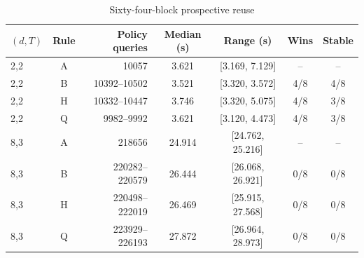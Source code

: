 \begin{table}[htbp]
\centering\caption{Sixty-four-block prospective reuse}\label{tab:reuse70}
{\small\setlength{\tabcolsep}{3pt}
\begin{tabular}{lcrcccc}
\hline
$(d,T)$ & Rule & Policy queries & Median (s) & Range (s) & Wins & Stable \\
\hline
2,2 & A & 10057 & 3.621 & [3.169, 7.129] & -- & -- \\
2,2 & B & 10392--10502 & 3.521 & [3.320, 3.572] & 4/8 & 4/8 \\
2,2 & H & 10332--10447 & 3.746 & [3.320, 5.075] & 4/8 & 3/8 \\
2,2 & Q & 9982--9992 & 3.621 & [3.120, 4.473] & 4/8 & 3/8 \\
8,3 & A & 218656 & 24.914 & [24.762, 25.216] & -- & -- \\
8,3 & B & 220282--220579 & 26.444 & [26.068, 26.921] & 0/8 & 0/8 \\
8,3 & H & 220498--222019 & 26.469 & [25.915, 27.568] & 0/8 & 0/8 \\
8,3 & Q & 223929--226193 & 27.872 & [26.964, 28.973] & 0/8 & 0/8 \\
\hline\end{tabular}}
\par{}
\end{table}
